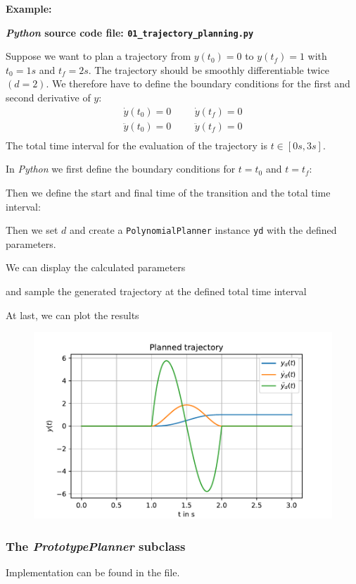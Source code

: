 \documentclass[a4paper,11pt,headings=standardclasses,parskip=half]{scrartcl}
\newcommand{\listcode}[3]{}
\newcommand{\listcodeplanning}[2]{\listcode{#1}{#2}{../sim/01_trajectory_planning.py}}
\newcommand{\py}{\emph{Python}\xspace}
\begin{document}
\textbf{Example:}

\textbf{\py source code file: \texttt{01\_trajectory\_planning.py}}

Suppose we want to plan a trajectory from $y(t_0)=0$ to $y(t_f) = 1$ with $t_0=1s$ and $t_f = 2s$. The trajectory should be smoothly differentiable twice $(d=2)$. We therefore have to define the boundary conditions for the first and second derivative of $y$: 
\begin{align*}
\dot{y}(t_0)=0 &&& \dot{y}(t_f)=0 \\
\ddot{y}(t_0)=0 &&& \ddot{y}(t_f)=0 \\
\end{align*}
The total time interval for the evaluation of the trajectory is $t\in[0s,3s]$.

In \py we first define the boundary conditions for $t=t_0$ and $t=t_f$:
\listcodeplanning{7}{8}
Then we define the start and final time of the transition and the total time interval:
\listcodeplanning{9}{11}
Then we set $d$ and create a \texttt{PolynomialPlanner} instance \texttt{yd} with the defined parameters.
\listcodeplanning{12}{13}
We can display the calculated parameters
\listcodeplanning{15}{16}
and sample the generated trajectory at the defined total time interval
\listcodeplanning{18}{19}
At last, we can plot the results
\listcodeplanning{21}{27}
\begin{figure}[ht]
\centering
\includegraphics[scale=0.9]{img/planned_trajectory.pdf}
\end{figure}
\subsubsection{The \emph{PrototypePlanner} subclass}
Implementation can be found in the file.
\newpage
\end{document}
